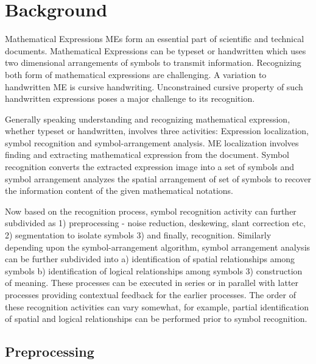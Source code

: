 \chapter{Background}
%

Mathematical Expressions MEs form an essential part of scientific
and technical documents. Mathematical Expressions can be typeset or
handwritten which uses two dimensional arrangements of symbols to
transmit information. Recognizing both form of mathematical
expressions are challenging. A variation to handwritten ME is
cursive handwriting. Unconstrained cursive property of such
handwritten expressions poses a major challenge to its recognition.

Generally speaking understanding and recognizing mathematical
expression, whether typeset or handwritten, involves three
activities: Expression localization, symbol recognition and
symbol-arrangement analysis. ME localization involves finding and
extracting mathematical expression from the document. Symbol
recognition converts the extracted expression image into a set of
symbols and symbol arrangement analyzes the spatial arrangement of
set of symbols to recover the information content of the given
mathematical notations.

Now based on the recognition process, symbol recognition activity
can further subdivided as 1) preprocessing - noise reduction,
deskewing, slant correction etc, 2) segmentation to isolate symbols
3) and finally, recognition. Similarly depending upon the
symbol-arrangement algorithm, symbol arrangement analysis can be
further subdivided into a) identification of spatial relationships
among symbols b) identification of logical relationships among
symbols 3) construction of meaning. These processes can be executed
in series or in parallel with latter processes providing contextual
feedback for the earlier processes. The order of these recognition
activities can vary somewhat, for example, partial identification of
spatial and logical relationships can be performed prior to symbol
recognition.

\section{Preprocessing}
%

